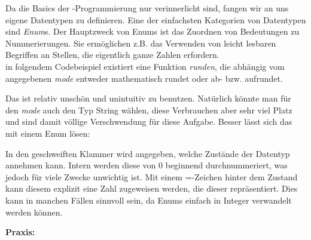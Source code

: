 
Da die Basics der \Cpp-Programmierung nur verinnerlicht sind, fangen wir an uns eigene Datentypen zu definieren.
Eine der einfachsten Kategorien von Datentypen sind \emph{Enum}s. Der Hauptzweck von Enums ist das Zuordnen von Bedeutungen zu Nummerierungen.
Sie ermöglichen z.B. das Verwenden von leicht lesbaren Begriffen an Stellen, die eigentlich ganze Zahlen erfordern. \\
in folgendem Codebeispiel existiert eine Funktion \emph{runden}, die abhängig vom angegebenen \emph{mode} entweder mathematisch rundet oder ab- bzw. aufrundet.


Das ist relativ unschön und unintuitiv zu benutzen. Natürlich könnte man für den \emph{mode} auch den Typ String wählen,
diese Verbrauchen aber sehr viel Platz und sind damit völlige Verschwendung für diese Aufgabe.
Besser lässt sich das mit einem Enum lösen:


In den geschweiften Klammer wird angegeben, welche Zustände der Datentyp annehmen kann.
Intern werden diese von 0 beginnend durchnummeriert, was jedoch für viele Zwecke unwichtig ist.
Mit einem =-Zeichen hinter dem Zustand kann diesem explizit eine Zahl zugeweisen werden, die dieser repräsentiert.
Dies kann in manchen Fällen sinnvoll sein, da Enums einfach in Integer verwandelt werden können.

\textbf{Praxis:}
